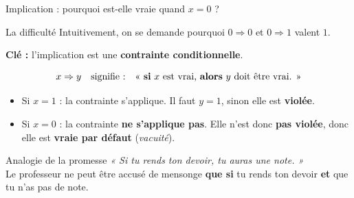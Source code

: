 \begin{frame}{Implication : pourquoi est-elle vraie quand \(x = 0\) ?}

    \begin{alertblock}{La difficulté}
        Intuitivement, on se demande pourquoi \(0 \Rightarrow 0\) et \(0 \Rightarrow 1\) valent \(1\).
    \end{alertblock}

    \vspace{0.3cm}

    \textbf{Clé :} l'implication est une \textbf{contrainte conditionnelle}.

    \vspace{0.2cm}

    \[
        x \Rightarrow y \quad \text{signifie :} \quad \text{« \textbf{si} } x \text{ est vrai, \textbf{alors} } y \text{ doit être vrai. »}
    \]

    \vspace{0.3cm}

    \begin{itemize}
        \item Si \(x = 1\) : la contrainte s'applique. Il faut \(y = 1\), sinon elle est \textbf{violée}.
        \item Si \(x = 0\) : la contrainte \textbf{ne s'applique pas}. Elle n'est donc \textbf{pas violée}, donc elle est \textbf{vraie par défaut} (\textit{vacuité}).
    \end{itemize}

    \vspace{0.4cm}

    \begin{exampleblock}{Analogie de la promesse}
        \textit{« Si tu rends ton devoir, tu auras une note. »}\\[0.2cm]
        Le professeur ne peut être accusé de mensonge \textbf{que si} tu rends ton devoir \textbf{et} que tu n'as pas de note.
    \end{exampleblock}

\end{frame}
